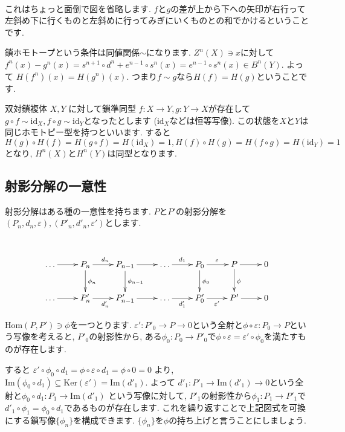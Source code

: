 \documentclass{jsarticle}
\def\Im{\mathrm{Im}}
\def\Ker{\mathrm{Ker}}
\def\Hom{\mathrm{Hom}}
\def\id{\mathrm{id}}
\theoremstyle{definition}
\numberwithin{theorem}{section}
\begin{document}
\hrulefill\\

これはちょっと面倒で図を省略します. $f$と$g$の差が上から下への矢印が右行って左斜め下に行くものと左斜めに行ってみぎにいくものとの和でかけるということです.

鎖ホモトープという条件は同値関係$\sim$になります. $Z^n(X) \ni x$に対して$f^n(x) - g^n(x) = s^{n+1} \circ d^n + e^{n-1}\circ s^n(x) = e^{n-1}\circ s^n(x) \in B^n(Y)$. 
よって $H(f^n)(x) = H(g^n)(x)$. つまり$f\sim g$なら$H(f) = H(g)$ということです.

双対鎖複体 $X, Y$ に対して鎖準同型 $f: X\rightarrow Y, g: Y\rightarrow X$が存在して $g\circ f \sim \id_X, f\circ g \sim \id_Y$となったとします
($\id_X$などは恒等写像). この状態を$X$と$Y$は同じホモトピー型を持つといいます. すると $H(g)\circ H(f) = H(g\circ f) = H(\id_X) = 1, H(f)\circ H(g) = H(f\circ g) = H(\id_Y) = 1$となり, 
$H^n(X)$と$H^n(Y)$は同型となります. 

\subsection{射影分解の一意性}
射影分解はある種の一意性を持ちます. $P$と$P'$の射影分解を$(P_n, d_n, \varepsilon), (P'_n, d'_n, \varepsilon')$とします.

\hrulefill\\

\begin{equation*}
\xymatrix{
  \ldots \ar[r] & P_n \ar[r]^{d_n} \ar[d]^{\phi_n} & P_{n-1} \ar[r] \ar[d]^{\phi_{n-1}} & \ldots \ar[r]^{d_1} & P_0 \ar[r]^{\varepsilon} \ar[d]^{\phi_0} & P \ar[r] \ar[d]^{\phi} & 0 \\
  \ldots \ar[r] & P'_n \ar[r]_{d'_n} & P'_{n-1} \ar[r]& \ldots \ar[r]_{d'_1}& P'_0 \ar[r]_{\varepsilon'} & P' \ar[r]& 0
}
\end{equation*}

$\Hom(P, P') \ni \phi$を一つとります. $\varepsilon': P'_0 \rightarrow P \rightarrow 0$という全射と$\phi\circ\varepsilon: P_0 \rightarrow P$という写像を考えると, 
$P'_0$の射影性から, ある$\phi_0: P_0 \rightarrow P'_0$で$\phi\circ\varepsilon = \varepsilon'\circ\phi_0$を満たすものが存在します. 

すると $\varepsilon'\circ\phi_0\circ d_1 = \phi\circ\varepsilon\circ d_1 = \phi\circ 0 = 0$ より, $\Im(\phi_0\circ d_1) \subseteq \Ker(\varepsilon') = \Im(d'_1)$.
よって $d'_1 : P'_1 \rightarrow \Im(d'_1) \rightarrow 0$という全射と$\phi_0\circ d_1: P_1 \rightarrow \Im(d'_1)$
という写像に対して, $P'_1$の射影性から$\phi_1: P_1 \rightarrow P'_1$で$d'_1\circ \phi_1 = \phi_0\circ d_1$であるものが存在します.
これを繰り返すことで上記図式を可換にする鎖写像$\{\phi_n\}$を構成できます. $\{\phi_n\}$を$\phi$の持ち上げと言うことにしましょう.
\vspace{2cm}
\end{document}
